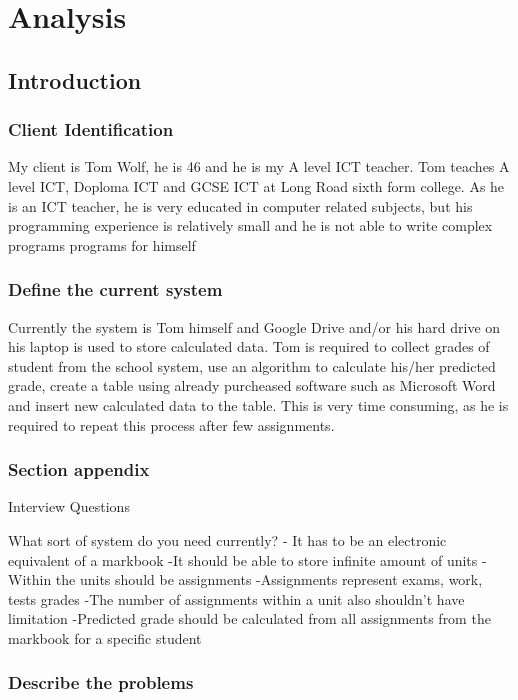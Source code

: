 \chapter{Analysis}

\section{Introduction}

\subsection{Client Identification} 
My client is Tom Wolf, he is 46 and he is my A level ICT teacher. Tom teaches A level ICT, Doploma ICT and GCSE ICT at Long Road sixth form college. As he is an ICT teacher, he is very educated in computer related subjects, but his programming experience is relatively small and he is not able to write complex programs programs for himself

\subsection{Define the current system} 
Currently the system is Tom himself and Google Drive and/or his hard drive on his laptop is used to store calculated data. Tom is required to collect grades of student from the school system, use an algorithm to calculate his/her predicted grade, create a table using already purcheased software such as Microsoft Word and  insert new calculated data to the table. This is very time consuming, as he is required to repeat this process after few assignments.

\subsection{Section appendix}

Interview Questions

What sort of system do you need currently?
- It has to be an electronic equivalent of a markbook
-It should be able to store infinite amount of units 
-Within the units should be assignments
-Assignments represent exams, work, tests grades
-The number of assignments within a unit also shouldn't have limitation
-Predicted grade should be calculated from all assignments from the markbook for a specific student


\subsection{Describe the problems}

